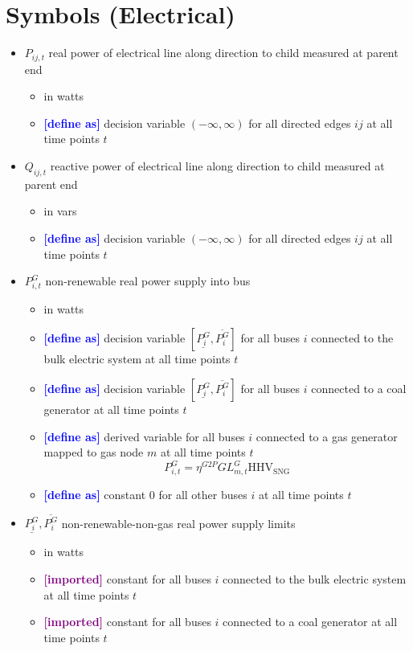 \documentclass{article}
\newcommand{\lo}[1]{\underline{#1}}
\newcommand{\hi}[1]{\overline{#1}}
\newcommand{\define}{\textcolor{blue}{\textbf{[define as] }}}
\newcommand{\imported}{\textcolor{purple}{\textbf{[imported] }}}
\begin{document}
\section{Symbols (Electrical)}
\begin{itemize}
\item $P_{ij,t}$ real power of electrical line along direction to child measured
  at parent end
  \begin{itemize}
    \item in watts
    \item \define decision variable $(-\infty, \infty)$ for all directed edges
      $ij$ at all time points $t$
  \end{itemize}

\item $Q_{ij,t}$ reactive power of electrical line along direction to child
  measured at parent end
  \begin{itemize}
    \item in vars
    \item \define decision variable $(-\infty, \infty)$ for all directed edges
      $ij$ at all time points $t$
  \end{itemize}

\item $P^G_{i,t}$ non-renewable real power supply into bus
  \begin{itemize}
    \item in watts
    \item \define decision variable $[\lo{P^G_i}, \hi{P^G_i}]$ for all buses $i$
      connected to the bulk electric system at all time points $t$
    \item \define decision variable $[\lo{P^G_i}, \hi{P^G_i}]$ for all buses $i$
      connected to a coal generator at all time points $t$
    \item \define derived variable for all buses $i$ connected to a gas
      generator mapped to gas node $m$ at all time points $t$
      \begin{equation*}
        P^G_{i,t} = \eta^{G2P} GL^G_{m,t} \text{HHV}_{\text{SNG}}
      \end{equation*}
    \item \define constant $0$ for all other buses $i$ at all time points $t$
  \end{itemize}

\item $\lo{P^G_i}, \hi{P^G_i}$ non-renewable-non-gas real power supply limits
  \begin{itemize}
  \item in watts
  \item \imported constant for all buses $i$ connected to the bulk electric
    system at all time points $t$
  \item \imported constant for all buses $i$ connected to a coal generator at
    all time points $t$
  \end{itemize}


\end{itemize}
\end{document}
